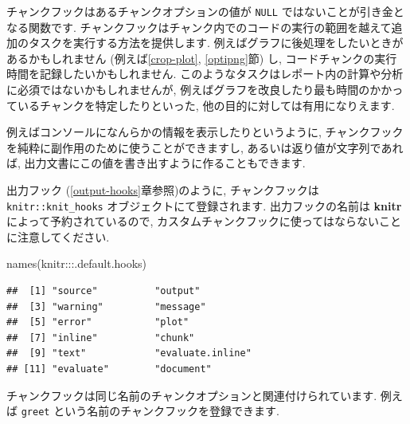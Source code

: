 \documentclass[
  11pt,
]{bxjsreport}
\newenvironment{Shaded}{\begin{snugshade}}{\end{snugshade}}
\newcommand{\AttributeTok}[1]{\textcolor[rgb]{0.77,0.63,0.00}{#1}}
\newcommand{\ControlFlowTok}[1]{\textcolor[rgb]{0.13,0.29,0.53}{\textbf{#1}}}
\newcommand{\FunctionTok}[1]{\textcolor[rgb]{0.00,0.00,0.00}{#1}}
\newcommand{\NormalTok}[1]{#1}
\newcommand{\SpecialCharTok}[1]{\textcolor[rgb]{0.00,0.00,0.00}{#1}}
\newcommand{\StringTok}[1]{\textcolor[rgb]{0.31,0.60,0.02}{#1}}
\begin{document}
チャンクフックはあるチャンクオプションの値が \texttt{NULL} ではないことが引き金となる関数です. チャンクフックはチャンク内でのコードの実行の範囲を越えて追加のタスクを実行する方法を提供します. 例えばグラフに後処理をしたいときがあるかもしれません (例えば\ref{crop-plot}, \ref{optipng}節) し, コードチャンクの実行時間を記録したいかもしれません. このようなタスクはレポート内の計算や分析に必須ではないかもしれませんが, 例えばグラフを改良したり最も時間のかかっているチャンクを特定したりといった, 他の目的に対しては有用になりえます.

例えばコンソールになんらかの情報を表示したりというように, チャンクフックを純粋に副作用のために使うことができますし, あるいは返り値が文字列であれば, 出力文書にこの値を書き出すように作ることもできます.

出力フック (\ref{output-hooks}章参照)のように, チャンクフックは \texttt{knitr::knit\_hooks} オブジェクトにて登録されます. 出力フックの名前は \textbf{knitr} によって予約されているので, カスタムチャンクフックに使ってはならないことに注意してください.

\begin{Shaded}
\begin{Highlighting}[numbers=left,,]
\FunctionTok{names}\NormalTok{(knitr}\SpecialCharTok{:::}\NormalTok{.default.hooks)}
\end{Highlighting}
\end{Shaded}

\begin{verbatim}
##  [1] "source"          "output"         
##  [3] "warning"         "message"        
##  [5] "error"           "plot"           
##  [7] "inline"          "chunk"          
##  [9] "text"            "evaluate.inline"
## [11] "evaluate"        "document"
\end{verbatim}

チャンクフックは同じ名前のチャンクオプションと関連付けられています. 例えば \texttt{greet} という名前のチャンクフックを登録できます.

\begin{Shaded}
\end{Shaded}
\end{document}
